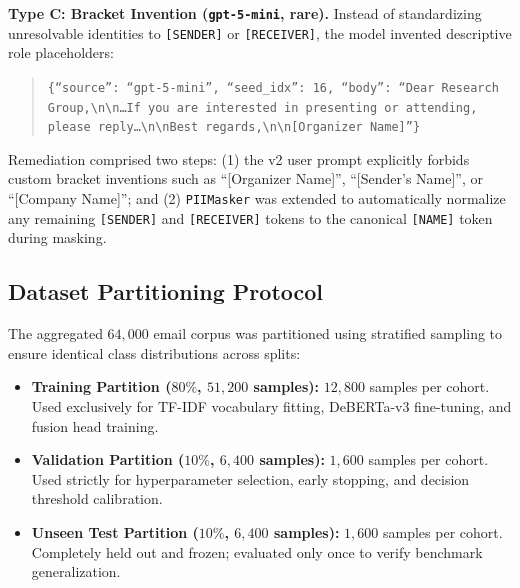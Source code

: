 \documentclass[journal]{IEEEtran}
\begin{document}
\textbf{Type C: Bracket Invention (\texttt{gpt-5-mini}, rare).}
Instead of standardizing unresolvable identities to \texttt{[SENDER]} or \texttt{[RECEIVER]}, the model invented descriptive role placeholders:
\begin{quote}\small
\texttt{\{``source'': ``gpt-5-mini'', ``seed\_idx'': 16, ``body'': ``Dear Research Group,\textbackslash n\textbackslash n\ldots If you are interested in presenting or attending, please reply\ldots\textbackslash n\textbackslash nBest regards,\textbackslash n\textbackslash n[Organizer Name]''\}}
\end{quote}
Remediation comprised two steps: (1) the v2 user prompt explicitly forbids custom bracket inventions such as ``[Organizer Name]'', ``[Sender's Name]'', or ``[Company Name]''; and (2) \texttt{PIIMasker} was extended to automatically normalize any remaining \texttt{[SENDER]} and \texttt{[RECEIVER]} tokens to the canonical \texttt{[NAME]} token during masking.

\subsection{Dataset Partitioning Protocol}
The aggregated $64{,}000$ email corpus was partitioned using stratified sampling to ensure identical class distributions across splits:
\begin{itemize}
    \item \textbf{Training Partition ($80\%$, $51{,}200$ samples):} $12{,}800$ samples per cohort. Used exclusively for TF-IDF vocabulary fitting, DeBERTa-v3 fine-tuning, and fusion head training.
    \item \textbf{Validation Partition ($10\%$, $6{,}400$ samples):} $1{,}600$ samples per cohort. Used strictly for hyperparameter selection, early stopping, and decision threshold calibration.
    \item \textbf{Unseen Test Partition ($10\%$, $6{,}400$ samples):} $1{,}600$ samples per cohort. Completely held out and frozen; evaluated only once to verify benchmark generalization.
\end{itemize}
\end{document}
